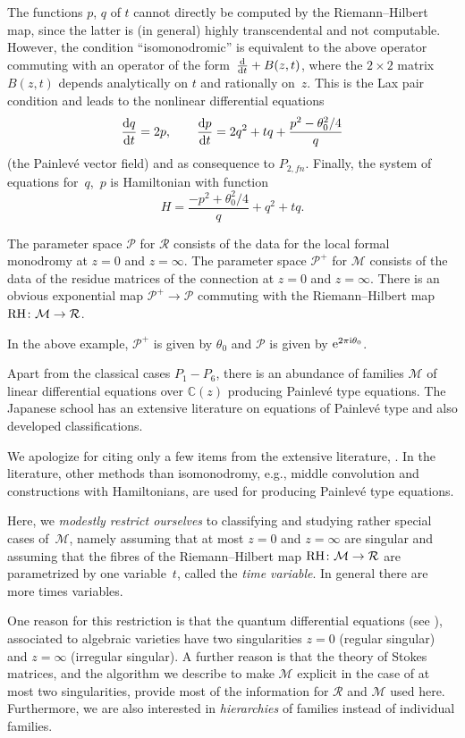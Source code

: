 \documentclass[10pt,a4paper]{amsart}
\numberwithin{equation}{section}
\begin{document}
The functions $p$, $q$ of $t$ cannot directly be computed by the Riemann--Hilbert map, since the latter
 is (in general) highly transcendental and not computable. However, the condition ``isomonodromic'' is equivalent to
the above operator commuting with an operator of the form~${\frac{{\rm d}}{{\rm d}t}+B(z,t)}$, where the $2\times 2$ matrix
$B(z,t)$ depends analytically on $t$ and rationally on~$z$. This is the Lax pair condition and leads to the nonlinear
differential equations
\[
\frac{{\rm d}q}{{\rm d}t}=2p , \qquad \frac{{\rm d}p}{{\rm d}t}=2q^2+tq+\frac{p^2-\theta_0^2/4}{q}
\]
 (the Painlev\'e vector field)
and as consequence to $P_{2,fn}$. Finally, the system of equations for~$q$,~$p$ is Hamiltonian with function
\[
H=\frac{-p^2+\theta_0^2/4}{q}+q^2+tq.
\]

The parameter space $\mathcal{P}$ for $\mathcal{R}$ consists of the data for the local formal monodromy at $z=0$ and $z=\infty$. The parameter space $\mathcal{P}^+$ for $\mathcal{M}$ consists of the data of the residue matrices of the connection at $z=0$ and $z=\infty$. There is an obvious exponential map $\mathcal{P}^+\rightarrow \mathcal{P}$
commuting with the Riemann--Hilbert map ${\rm RH}\colon \mathcal{M}\rightarrow \mathcal{R}$.

In the above example, $\mathcal{P}^+$ is given by $\theta_0$ and $\mathcal{P}$ is given by ${\rm e}^{2\pi {\rm i} \theta_0}$.

 Apart from the classical cases $P_1-P_6$, there is an abundance of families $\mathcal{M}$ of linear differential equations over $\mathbb{C}(z)$ producing Painlev\'e type equations. The Japanese school has an extensive literature on equations of Painlev\'e type and also developed classifications.

 We apologize for citing only a few items from the extensive
literature, \cite{F-I-K-N,H-K-N-S,J-M-U,K3,K2,K4,K-N-S,Mi,N-Y,O-O,O1}. In the literature, other methods than isomonodromy,
 e.g., middle convolution and constructions with Hamiltonians, are used for producing Painlev\'e type equations.

Here, we {\it modestly restrict ourselves} to classifying and studying rather special cases of~$\mathcal{M}$, namely assuming that at most $z=0$ and $z=\infty$ are singular and assuming that the fibres of the Riemann--Hilbert map
${\rm RH}\colon\mathcal{M}\rightarrow \mathcal{R}$ are parametrized by one variable~$t$, called the {\it time variable}.
In general there are more times variables.

 One reason for this restriction is that the quantum differential equations (see \cite{C-D-G,G-G-I,G2,G1}), associated to algebraic varieties have two singularities $z=0$ (regular singular) and $z=\infty$ (irregular singular). A further reason is that the theory of Stokes matrices,
and the algorithm we describe to make $\mathcal{M}$ explicit in the case of at most two singularities, provide most of the information for $\mathcal{R}$ and $\mathcal{M}$ used here.
Furthermore, we are also interested in {\it hierarchies} of families instead of individual families.
\end{document}
